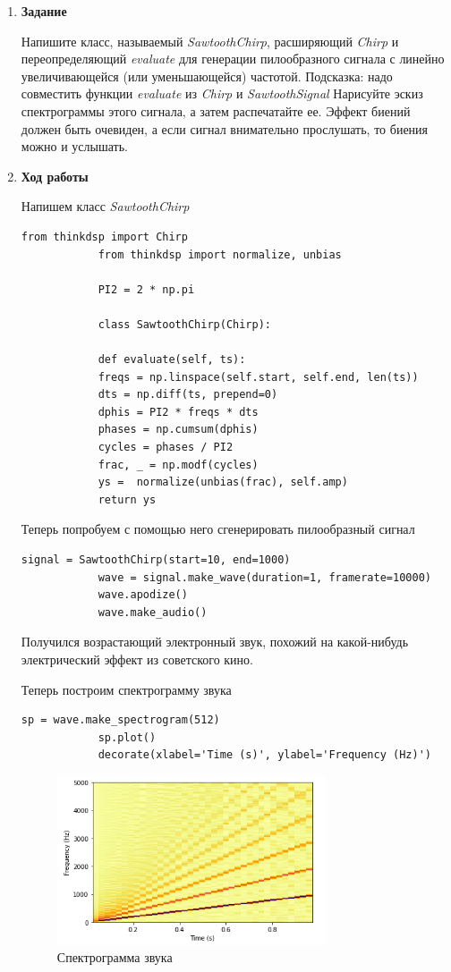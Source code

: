 \documentclass[a4paper,12pt]{article}
\begin{document}
	\begin{enumerate}
		
		\item \textbf{Задание}
		
		Напишите класс, называемый \textit{SawtoothChirp}, расширяющий \textit{Chirp} и переопределяющий \textit{evaluate} для генерации пилообразного сигнала с линейно увеличивающейся (или уменьшающейся) частотой.
		Подсказка: надо совместить функции \textit{evaluate} из \textit{Chirp} и \textit{SawtoothSignal}
		Нарисуйте эскиз спектрограммы этого сигнала, а затем распечатайте ее. Эффект биений должен быть очевиден, а если сигнал внимательно прослушать, то биения можно и услышать.
		
		
		\item \textbf{Ход работы}
		
		Напишем класс \textit{SawtoothChirp}
		\begin{lstlisting}[caption=Класс \textit{SawtoothChirp}]
			from thinkdsp import Chirp
			from thinkdsp import normalize, unbias
			
			PI2 = 2 * np.pi
			
			class SawtoothChirp(Chirp):
			
			def evaluate(self, ts):
			freqs = np.linspace(self.start, self.end, len(ts))
			dts = np.diff(ts, prepend=0)
			dphis = PI2 * freqs * dts
			phases = np.cumsum(dphis)
			cycles = phases / PI2
			frac, _ = np.modf(cycles)
			ys =  normalize(unbias(frac), self.amp)
			return ys
		\end{lstlisting}
		
		Теперь попробуем с помощью него сгенерировать пилообразный сигнал
		\begin{lstlisting}[caption=Генерация пилообразного сигнала]
			signal = SawtoothChirp(start=10, end=1000)
			wave = signal.make_wave(duration=1, framerate=10000)
			wave.apodize()
			wave.make_audio()
		\end{lstlisting}
		
		Получился возрастающий электронный звук, похожий на какой-нибудь электрический эффект из советского кино.
		
		Теперь построим спектрограмму звука
		\begin{lstlisting}[caption=Построение спектрограммы звука]
			sp = wave.make_spectrogram(512)
			sp.plot()
			decorate(xlabel='Time (s)', ylabel='Frequency (Hz)')
		\end{lstlisting}
		\begin{figure}[H]
			\centering
			\includegraphics[width=0.75\textwidth]{2_1.png}
			\caption{Спектрограмма звука}
			\label{fig:2.1}
		\end{figure}
		

\end{enumerate}
\end{document}
